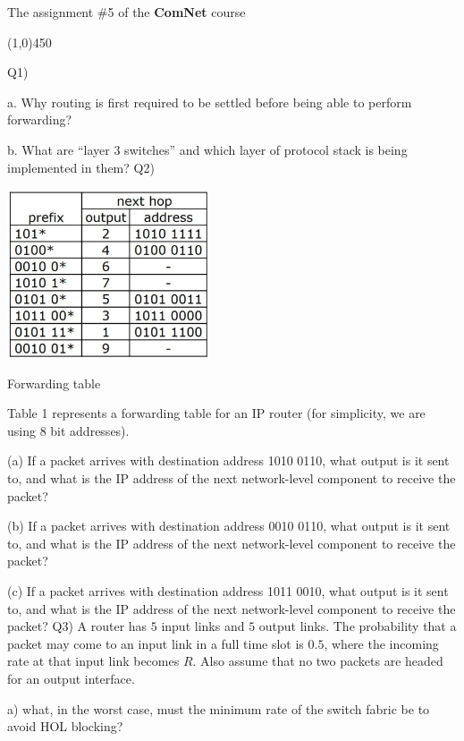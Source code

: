 \documentclass[10pt,letterpaper]{article}
\newcommand{\hl}{
\begin{center}
\line(1,0){450}
\end{center}}
\begin{document}
\Large
\begin{center}
The assignment \#5 of the \textbf{ComNet} course
\end{center}
\hl
Q1)

a. Why routing is first required to be settled before being able to perform forwarding?

b. What are ``layer 3 switches'' and which layer of protocol stack is being implemented in them?
\newline
\newline
Q2) 
\begin{table}[h]
\begin{center}
\includegraphics[width=60mm]{Table1}
\caption{Forwarding table}
\end{center}
\end{table}
Table 1 represents a forwarding table for an IP router (for simplicity, we are using 8 bit addresses).

(a) If a packet arrives with destination address 1010 0110, what output is it sent to, and what is the IP address of the next network-level component to receive the packet?

(b) If a packet arrives with destination address 0010 0110, what output is it sent to, and what is the IP address of the next network-level component to receive the packet?

(c) If a packet arrives with destination address 1011 0010, what output is it sent to, and what is the 
IP address of the next network-level component to receive the packet?
\newline
\newline
Q3) A router has $5$ input links and $5$ output links. The probability that a packet may come to an input link in a full time slot is $0.5$, where the incoming rate at that input link becomes $R$. Also assume that no two packets are headed for an output interface.

a) what, in the worst case, must the minimum rate of the switch fabric be  to avoid HOL blocking?
\end{document}
